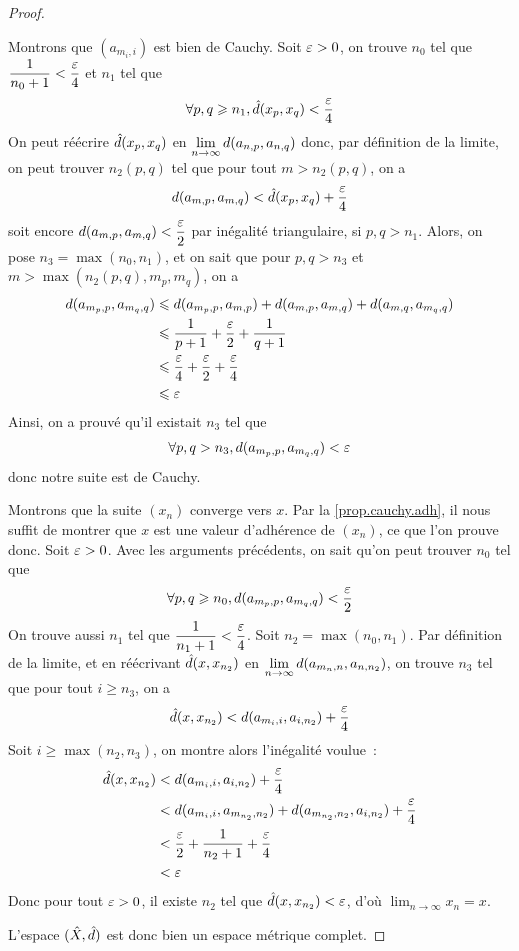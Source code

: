 \begin{proof}
\begin{itemize}
    Montrons que $(a_{m_i,i})$ est bien de Cauchy. Soit $\varepsilon > 0$, on
    trouve $n_0$ tel que $\dfrac{1}{n_0 + 1} < \dfrac{\varepsilon}{4}$ et $n_1$
    tel que
    \[\forall p,q \geqslant n_1, \hat{d}(x_p,x_q) < \frac{\varepsilon}{4}\]
    On peut réécrire $\hat{d}(x_p,x_q)$ en
    $\displaystyle\lim_{n \to \infty} d(a_{n,p}, a_{n,q})$ donc, par
    définition de la limite, on peut trouver $n_2(p,q)$ tel que pour tout
    $m > n_2(p,q)$, on a
    \[d(a_{m,p},a_{m,q}) < \hat{d}(x_p,x_q) + \frac{\varepsilon}{4}\]
    soit encore $d(a_{m,p},a_{m,q}) < \dfrac{\varepsilon}{2}$ par inégalité
    triangulaire, si $p,q > n_1$. Alors, on pose $n_3 = \max(n_0,n_1)$, et on
    sait que pour $p,q > n_3$ et $m > \max(n_2(p,q), m_p,m_q)$, on a
    \begin{align*}
      d(a_{m_p,p},a_{m_q,q}) &\leqslant d(a_{m_p,p},a_{m,p}) +
      d(a_{m,p}, a_{m,q}) + d(a_{m,q},a_{m_q,q}) \\
      &\leqslant \frac{1}{p + 1} + \frac{\varepsilon}{2} + \frac{1}{q + 1}\\
      &\leqslant \frac{\varepsilon}{4} + \frac{\varepsilon}{2} +
      \frac{\varepsilon}{4}\\
      &\leqslant \varepsilon
    \end{align*}
    Ainsi, on a prouvé qu'il existait $n_3$ tel que
    \[\forall p,q > n_3, d(a_{m_p,p}, a_{m_q,q}) < \varepsilon\]
    donc notre suite est de Cauchy.

    Montrons que la suite $(x_n)$ converge vers $x$. Par la
    \cref{prop.cauchy.adh}, il nous suffit de montrer que $x$ est une valeur
    d'adhérence de $(x_n)$, ce que l'on prouve donc. Soit $\varepsilon > 0$.
    Avec les arguments précédents, on sait qu'on peut trouver $n_0$ tel que
    \[\forall p,q \geqslant n_0, d(a_{m_p,p},a_{m_q,q}) < \frac{\varepsilon}{2}\]
    On trouve aussi $n_1$ tel que
    $\dfrac{1}{n_1 + 1} < \dfrac{\varepsilon}{4}$. Soit $n_2 = \max(n_0,n_1)$.
    Par définition de la limite, et en réécrivant $\hat{d}(x,x_{n_2})$ en
    $\displaystyle\lim_{n\to\infty} d(a_{m_n,n},a_{n,n_2})$,
    on trouve $n_3$ tel que pour tout $i \geq n_3$, on a
    \[\hat{d}(x,x_{n_2}) < d(a_{m_i,i}, a_{i,n_2}) + \frac{\varepsilon}{4}\]
    Soit $i \geq \max(n_2,n_3)$, on montre alors l'inégalité voulue~:
    \begin{align*}
      \hat{d}(x,x_{n_2}) &< d(a_{m_i,i}, a_{i,n_2}) + \frac{\varepsilon}{4}\\
      &< d(a_{m_i,i}, a_{m_{n_2},n_2}) + d(a_{m_{n_2},n_2}, a_{i,n_2})
      + \frac{\varepsilon}{4}\\
      &< \frac{\varepsilon}{2} + \frac{1}{n_2 + 1} + \frac{\varepsilon}{4}\\
      &< \varepsilon
    \end{align*}
    Donc pour tout $\varepsilon > 0$, il existe $n_2$ tel que
    $\hat{d}(x,x_{n_2}) < \varepsilon$, d'où
    $\displaystyle\lim_{n \to \infty} x_n = x$.
  \end{itemize}
  L'espace $(\hat{X},\hat{d})$ est donc bien un espace métrique complet.
  

\end{proof}
